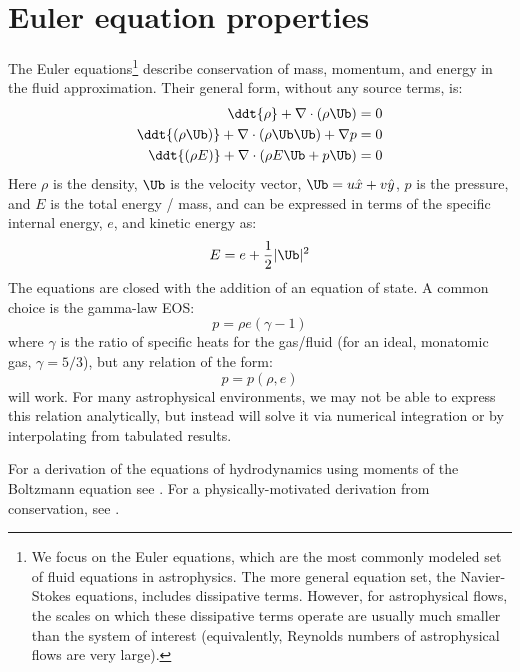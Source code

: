 \label{ch:compressible-theory}


\section{Euler equation properties}

The Euler equations\footnote{ We focus on the Euler equations, which
are the most commonly modeled set of fluid equations in astrophysics.
The more general equation set, the Navier-Stokes equations, includes
dissipative terms.  However, for astrophysical flows, the scales on
which these dissipative terms operate are usually much smaller than
the system of interest (equivalently, Reynolds numbers of
astrophysical flows are very large).} describe conservation of
mass, momentum, and energy in the fluid approximation.  Their general
form, without any source terms, is:  
\begin{align}
\ddt{\rho} + \nabla \cdot (\rho \Ub) &= 0 \\
\ddt{(\rho \Ub)} + \nabla \cdot (\rho \Ub \Ub) + \nabla p &= 0 \\
\ddt{(\rho E)} + \nabla \cdot (\rho E \Ub + p \Ub ) &= 0
\end{align}
Here $\rho$ is the density, $\Ub$ is the velocity vector, $\Ub =
u\hat{x} + v\hat{y}$, $p$ is the pressure, and $E$ is the total energy
/ mass, and can be expressed in terms of the specific internal energy,
$e$, and kinetic energy as:
\begin{equation}
E = e + \frac{1}{2} |\Ub|^2
\end{equation}
The equations are closed with the addition of an equation of state.  A common
choice is the gamma-law EOS:
\begin{equation}
p = \rho e(\gamma - 1)
\end{equation}
where $\gamma$ is the ratio of specific heats for the gas/fluid (for
an ideal, monatomic gas, $\gamma = 5/3$), but any relation of the form:
\begin{equation}
p = p(\rho, e)
\end{equation}
will work.  For many astrophysical environments, we may not be able to
express this relation analytically, but instead will solve it via
numerical integration or by interpolating from tabulated results.

For a derivation of the equations of hydrodynamics using moments of
the Boltzmann equation see \cite{shu,choudhuri}.  For a
physically-motivated derivation from conservation, see
\cite{choudhuri,leveque:2002}.

